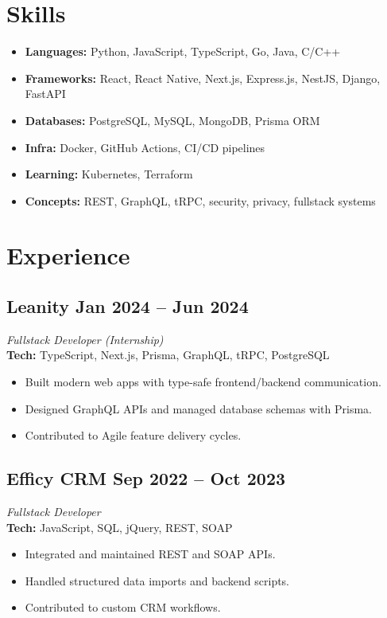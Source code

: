 \documentclass[11pt,a4paper]{article}
\begin{document}
\begin{paracol}{2}

\section*{Skills}
\begin{itemize}
  \item \textbf{Languages:} Python, JavaScript, TypeScript, Go, Java, C/C++
  \item \textbf{Frameworks:} React, React Native, Next.js, Express.js, NestJS, Django, FastAPI
  \item \textbf{Databases:} PostgreSQL, MySQL, MongoDB, Prisma ORM
  \item \textbf{Infra:} Docker, GitHub Actions, CI/CD pipelines
  \item \textbf{Learning:} Kubernetes, Terraform
  \item \textbf{Concepts:} REST, GraphQL, tRPC, security, privacy, fullstack systems
\end{itemize}

\switchcolumn

\section*{Experience}
\subsection{Leanity \hfill Jan 2024 -- Jun 2024}
\textit{Fullstack Developer (Internship)} \\
\textbf{Tech:} TypeScript, Next.js, Prisma, GraphQL, tRPC, PostgreSQL
\begin{itemize}
    \item Built modern web apps with type-safe frontend/backend communication.
    \item Designed GraphQL APIs and managed database schemas with Prisma.
    \item Contributed to Agile feature delivery cycles.
\end{itemize}

\subsection{Efficy CRM \hfill Sep 2022 -- Oct 2023}
\textit{Fullstack Developer} \\
\textbf{Tech:} JavaScript, SQL, jQuery, REST, SOAP
\begin{itemize}
    \item Integrated and maintained REST and SOAP APIs.
    \item Handled structured data imports and backend scripts.
    \item Contributed to custom CRM workflows.
\end{itemize}


\end{paracol}
\end{document}
